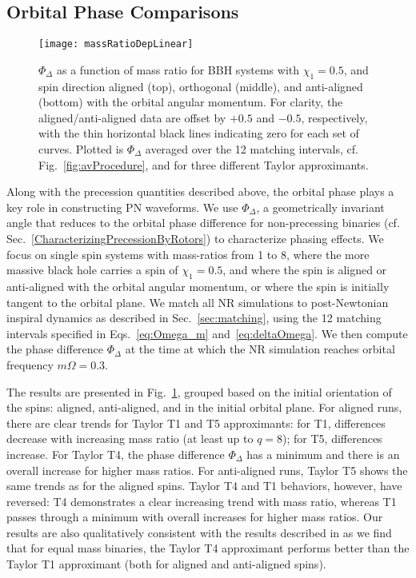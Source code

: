 \documentclass[aps,prd,amsmath,floatfix,twocolumn,superscriptaddress,nofootinbib,showpacs]{revtex4-1}
\begin{document}
\subsection{Orbital Phase Comparisons}
\label{sec:OrbitalPhaseComparisons}


\begin{figure}
  \centering
  \texttt{[image: massRatioDepLinear]}
  \caption{\label{fig:massRatioDep} $\Phi_{\Delta}$ as a function of
    mass ratio for BBH systems with $\chi_1=0.5$, and spin direction
    aligned (top), orthogonal (middle), and anti-aligned (bottom) with
    the orbital angular momentum.  For clarity, the
    aligned/anti-aligned data are offset by $+0.5$ and $-0.5$,
    respectively, with the thin horizontal black lines indicating zero
    for each set of curves.  Plotted is $\Phi_\Delta$ averaged over
    the 12 matching intervals, cf. Fig.~\ref{fig:avProcedure}, and for
    three different Taylor approximants.}
\end{figure}



Along with the precession quantities described above, the orbital
phase plays a key role in constructing PN waveforms.  We use
$\Phi_{\Delta}$, a geometrically invariant angle that reduces to the
orbital phase difference for non-precessing binaries
(cf. Sec.~\ref{CharacterizingPrecessionByRotors}) to characterize
phasing effects.  We focus on single spin systems with mass-ratios
from 1 to 8, where the more massive black hole carries a spin of
$\chi_1=0.5$, and where the spin is aligned or anti-aligned with the
orbital angular momentum, or where the spin is initially tangent to
the orbital plane.  We match all NR simulations to post-Newtonian
inspiral dynamics as described in Sec.~\ref{sec:matching}, using the
12 matching intervals specified in Eqs.~\eqref{eq:Omega_m}
and~\eqref{eq:deltaOmega}.  We then compute the phase difference
$\Phi_\Delta$ at the time at which the NR simulation reaches orbital
frequency $m\Omega=0.3$.


The results are presented in Fig.~\ref{fig:massRatioDep}, grouped
based on the initial orientation of the spins: aligned, anti-aligned,
and in the initial orbital plane. For aligned runs, there are clear
trends for Taylor T1 and T5 approximants: for T1, differences decrease
with increasing mass ratio (at least up to $q=8$); for T5, differences
increase.  For Taylor T4, the phase difference $\Phi_\Delta$ has a
minimum and there is an overall increase for higher mass ratios. For
anti-aligned runs, Taylor T5 shows the same trends as for the aligned
spins.  Taylor T4 and T1 behaviors, however, have reversed: T4
demonstrates a clear increasing trend with mass ratio, whereas T1
passes through a minimum with overall increases for higher mass
ratios. Our results are also qualitatively consistent with the results
described in \cite{HannamEtAl:2010} as we find that for equal mass
binaries, the Taylor T4 approximant performs better than the Taylor T1
approximant (both for aligned and anti-aligned spins).
\end{document}
